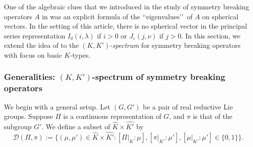 One of the algebraic clues
 that we introduced in the study 
 of symmetry breaking operators $A$ in \cite{sbon}
 was an explicit formula
 of the \lq\lq{eigenvalues}\rq\rq\
 of $A$
 on spherical vectors.  
In the setting of this article,
 there is no spherical vector
 in the principal series representation
 $I_{\delta}(i,\lambda)$ if $i>0$
 or $J_{\varepsilon}(j,\nu)$ if $j>0$.  
In this section,
 we extend the idea of \cite{sbon}
 to the 
$(K,K')$-{\it{spectrum}}
 for symmetry breaking operators
 with focus on 
basic $K$-types.  


\subsubsection{Generalities:
 $(K,K')$-spectrum of symmetry breaking operators}
We begin with a general setup.  
Let $(G,G')$ be a pair of real reductive Lie groups.  
Suppose $\Pi$ is a continuous representation of $G$, 
 and $\pi$ is that of the subgroup $G'$.  
We define a subset of $\widehat K \times \widehat{K'}$
 by 
\[
   {\mathcal{D}}(\Pi,\pi):=
   \{(\mu, \mu') \in \widehat K \times \widehat{K'}:
     [\Pi|_K:\mu], 
 [\pi|_{K'}:\mu'], 
 [\mu|_{K'}:\mu']
 \in \{0,1\}
\}.  
\]

